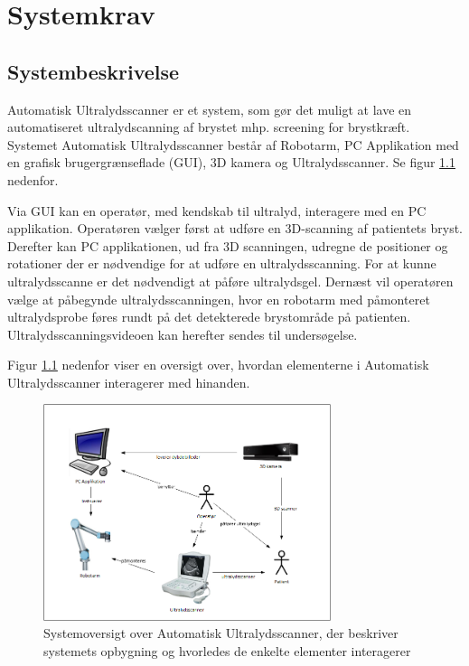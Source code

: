 \chapter{Systemkrav}\label{Systemkrav}
\section{Systembeskrivelse}
Automatisk Ultralydsscanner er et system, som gør det muligt at lave en automatiseret ultralydscanning af brystet mhp. screening for brystkræft. Systemet Automatisk Ultralydsscanner består af Robotarm, PC Applikation med en grafisk brugergrænseflade (GUI), 3D kamera og Ultralydsscanner. Se figur \ref{Systembeskrivelse} nedenfor. 

Via GUI kan en operatør, med kendskab til ultralyd, interagere med en PC applikation. Operatøren vælger først at udføre en 3D-scanning af patientets bryst. Derefter kan PC applikationen, ud fra 3D scanningen, udregne de positioner og rotationer der er nødvendige for at udføre en ultralydsscanning. For at kunne ultralydsscanne er det nødvendigt at påføre ultralydsgel. Dernæst vil operatøren vælge at påbegynde ultralydsscanningen, hvor en robotarm med påmonteret ultralydsprobe føres rundt på det detekterede brystområde på patienten. Ultralydsscanningsvideoen kan herefter sendes til undersøgelse.

Figur \ref{Systembeskrivelse} nedenfor viser en oversigt over, hvordan elementerne i Automatisk Ultralydsscanner interagerer med hinanden.
 
\begin{figure}[H]
    \centering
    \includegraphics[width=0.75\textwidth]{figurer/d/Kravspecifikation/Systembeskrivelse}
    \caption{Systemoversigt over Automatisk Ultralydsscanner, der beskriver systemets opbygning og hvorledes de enkelte elementer interagerer}
    \label{Systembeskrivelse}
\end{figure}


